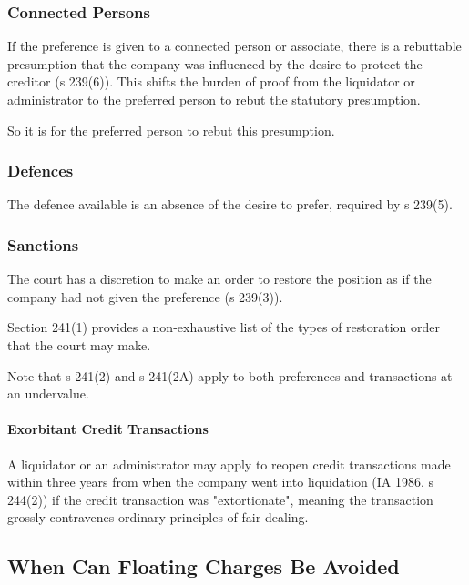 \documentclass[
]{article}
\begin{document}
\hypertarget{connected-persons}{%
\subsubsection{Connected Persons}\label{connected-persons}}

If the preference is given to a connected person or associate, there is
a rebuttable presumption that the company was influenced by the desire
to protect the creditor (s 239(6)). This shifts the burden of proof from
the liquidator or administrator to the preferred person to rebut the
statutory presumption.

So it is for the preferred person to rebut this presumption.

\hypertarget{defences-1}{%
\subsubsection{Defences}\label{defences-1}}

The defence available is an absence of the desire to prefer, required by
s 239(5).

\hypertarget{sanctions-1}{%
\subsubsection{Sanctions}\label{sanctions-1}}

The court has a discretion to make an order to restore the position as
if the company had not given the preference (s 239(3)).

Section 241(1) provides a non-exhaustive list of the types of
restoration order that the court may make.

Note that s 241(2) and s 241(2A) apply to both preferences and
transactions at an undervalue.

\hypertarget{exorbitant-credit-transactions}{%
\paragraph{Exorbitant Credit
Transactions}\label{exorbitant-credit-transactions}}

A liquidator or an administrator may apply to reopen credit transactions
made within three years from when the company went into liquidation (IA
1986, s 244(2)) if the credit transaction was "extortionate", meaning
the transaction grossly contravenes ordinary principles of fair dealing.

\hypertarget{when-can-floating-charges-be-avoided}{%
\subsection{When Can Floating Charges Be
Avoided}\label{when-can-floating-charges-be-avoided}}
\end{document}
